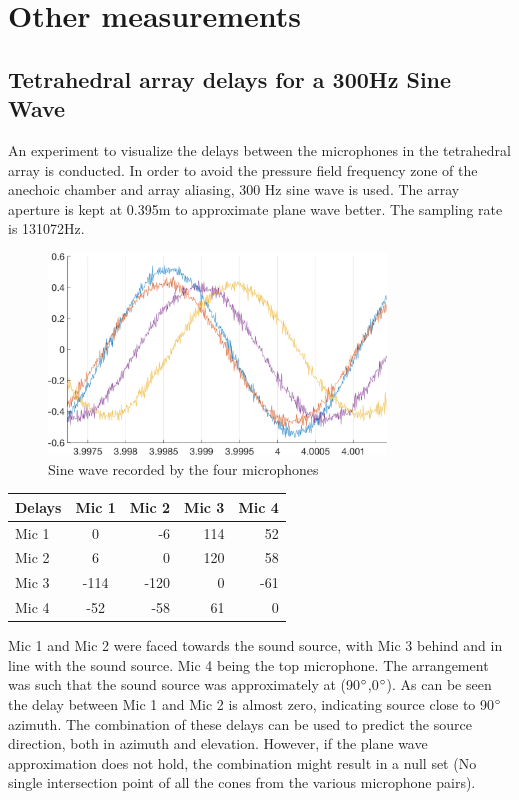 \chapter{Other measurements}\label{add_Meas_1}
\section{Tetrahedral array delays for a 300Hz Sine Wave}
An experiment to visualize the delays between the microphones in the tetrahedral array is conducted. In order to avoid the pressure field frequency zone of the anechoic chamber and array aliasing, 300 Hz sine wave is used. The array aperture is kept at 0.395m to approximate plane wave better. The sampling rate is 131072Hz.

\begin{figure}[H]
    \centering
    \includegraphics[width=0.8\textwidth]{Figures/delaytetra300Hz.png}
    \caption{Sine wave recorded by the four microphones}
    \label{fig:pinknoise}
\end{figure}

\begin{center}
  \begin{tabular}{ | l | c | r | r | r |}
    \hline
    Delays & Mic 1 & Mic 2 & Mic 3 & Mic 4 \\ \hline
    Mic 1 & 0 & -6&114 & 52  \\ \hline
    Mic 2 & 6  & 0 &120 & 58  \\ \hline
    Mic 3 & -114  & -120  & 0  &-61  \\ \hline
    Mic 4 & -52  & -58  &  61  & 0   \\ \hline
  \end{tabular}
\end{center}

Mic 1 and Mic 2 were faced towards the sound source, with Mic 3 behind and in line with the sound source. Mic 4 being the top microphone. The arrangement was such that the sound source was approximately at (90$\degree$,0$\degree$). As can be seen the delay between Mic 1 and Mic 2 is almost zero, indicating source close to 90$\degree$ azimuth. The combination of these delays can be used to predict the source direction, both in azimuth and elevation. However, if the plane wave approximation does not hold, the combination might result in a null set (No single intersection point of all the cones from the various microphone pairs).


